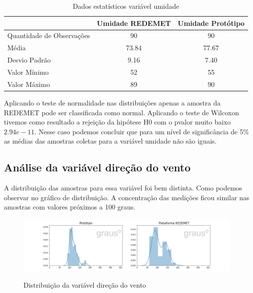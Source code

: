 \begin{table}[!h]
\centering
\begin{tabular}{l|c|c|}
\cline{2-3}
                                                & \multicolumn{1}{l|}{\textbf{Umidade REDEMET}} & \textbf{Umidade Protótipo} \\ \hline
\multicolumn{1}{|l|}{Quantidade de Observações} & 90                                            & 90                         \\ \hline
\multicolumn{1}{|l|}{Média}                     & 73.84                                         & 77.67                      \\ \hline
\multicolumn{1}{|l|}{Desvio Padrão}             & 9.16                                          & 7.40                       \\ \hline
\multicolumn{1}{|l|}{Valor Mínimo}              & 52                                            & 55                         \\ \hline
\multicolumn{1}{|l|}{Valor Máximo}              & 89                                            & 90                         \\ \hline
\end{tabular}
\caption{Dados estatísticos variável umidade}
\label{tab:est_desc_umidade_prot}
\end{table}

Aplicando o teste de normalidade nas distribuições apenas a amostra da REDEMET pode ser classificada como normal. Aplicando o teste de Wilcoxon tivemos como resultado a rejeição da hipótese H0 com o pvalor muito baixo $2.94e-11$. Nesse caso podemos concluir que para um nível de significância de 5\% as médias das amostras coletas para a variável umidade não são iguais.

\subsection{Análise da variável direção do vento}

A distribuição das amostras para essa variável foi bem distinta. Como podemos observar no gráfico de distribuição. A concentração das medições ficou similar nas amostras com valores próximos a 100 graus.

\begin{figure} [!h]
    \centering
    \caption{Distribuição da variável direção do vento}    
    \includegraphics [scale = 0.5] {Figuras/dist_dirvento.png}
    \label{fig:dist_dirvento}
\end{figure}

